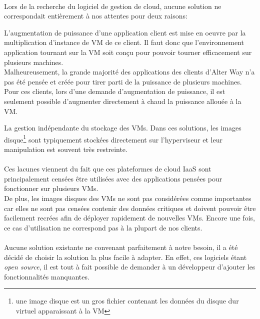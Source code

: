 \paragraph*{}
\label{cloudissues}
Lors de la recherche du logiciel de gestion de cloud, aucune solution ne correspondait entièrement à nos attentes pour deux raisons:
\begin{listi}
	\item L'augmentation de puissance d'une application client est mise en oeuvre par la multiplication d'instance de VM de ce client.
		Il faut donc que l'environnement application tournant sur la VM soit conçu pour pouvoir tourner efficacement sur
		plusieurs machines.\\
		Malheureusement, la grande majorité des applications des clients d'Alter Way n'a pas été pensée et créée pour tirer parti de la
		puissance de plusieurs machines.\\
		Pour ces clients, lors d'une demande d'augmentation de puissance, il est seulement possible d'augmenter directement à chaud
		la puissance allouée à la VM.

	\item La gestion indépendante du stockage des VMs. Dans ces solutions, les images disque\footnote{une image disque est un gros fichier contenant les données
	du disque dur virtuel apparaissant à la VM} sont typiquement stockées directement sur l'hyperviseur et leur manipulation est souvent très restreinte.
\end{listi}

\paragraph*{}
Ces lacunes viennent du fait que ces plateformes de cloud IaaS sont principalement censées être utilisées avec des applications pensées pour fonctionner sur plusieurs VMs. \\
De plus, les images disques des VMs ne sont pas considérées comme importantes car elles ne sont pas censées contenir des données critiques et doivent pouvoir être facilement
recrées afin de déployer rapidement de nouvelles VMs. Encore une fois, ce cas d'utilisation ne correspond pas à la plupart de nos clients.

\paragraph*{}
Aucune solution existante ne convenant parfaitement à notre besoin, il a été décidé de choisir la solution la plus facile à adapter.
En effet, ces logiciels étant \emph{open source}, il est tout à fait possible de demander à un développeur d'ajouter les fonctionnalités manquantes.

